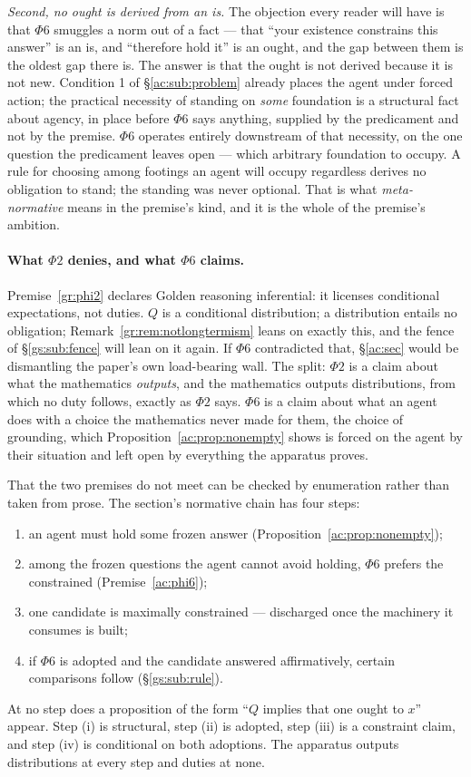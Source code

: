 \documentclass[11pt]{article}
\numberwithin{equation}{section}
\theoremstyle{plain}
\theoremstyle{definition}
\theoremstyle{remark}
\begin{document}
\emph{Second, no ought is derived from an is.} The objection every reader will have is that $\Phi6$ smuggles a norm out of a fact --- that ``your existence constrains this answer'' is an is, and ``therefore hold it'' is an ought, and the gap between them is the oldest gap there is. The answer is that the ought is not derived because it is not new. Condition 1 of \S\ref{ac:sub:problem} already places the agent under forced action; the practical necessity of standing on \emph{some} foundation is a structural fact about agency, in place before $\Phi6$ says anything, supplied by the predicament and not by the premise. $\Phi6$ operates entirely downstream of that necessity, on the one question the predicament leaves open --- which arbitrary foundation to occupy. A rule for choosing among footings an agent will occupy regardless derives no obligation to stand; the standing was never optional. That is what \emph{meta-normative} means in the premise's kind, and it is the whole of the premise's ambition.

\paragraph{What $\Phi2$ denies, and what $\Phi6$ claims.}\label{ac:rem:phi2split}
Premise~\ref{gr:phi2} declares Golden reasoning inferential: it licenses conditional expectations, not duties. $Q$ is a conditional distribution; a distribution entails no obligation; Remark~\ref{gr:rem:notlongtermism} leans on exactly this, and the fence of \S\ref{gs:sub:fence} will lean on it again. If $\Phi6$ contradicted that, \S\ref{ac:sec} would be dismantling the paper's own load-bearing wall. The split: $\Phi2$ is a claim about what the mathematics \emph{outputs}, and the mathematics outputs distributions, from which no duty follows, exactly as $\Phi2$ says. $\Phi6$ is a claim about what an agent does with a choice the mathematics never made for them, the choice of grounding, which Proposition~\ref{ac:prop:nonempty} shows is forced on the agent by their situation and left open by everything the apparatus proves.

That the two premises do not meet can be checked by enumeration rather than taken from prose. The section's normative chain has four steps:
\begin{enumerate}[label=(\roman*)]
    \item an agent must hold some frozen answer (Proposition~\ref{ac:prop:nonempty});
    \item among the frozen questions the agent cannot avoid holding, $\Phi6$ prefers the constrained (Premise~\ref{ac:phi6});
    \item one candidate is maximally constrained --- discharged once the machinery it consumes is built;
    \item if $\Phi6$ is adopted and the candidate answered affirmatively, certain comparisons follow (\S\ref{gs:sub:rule}).
\end{enumerate}
At no step does a proposition of the form ``$Q$ implies that one ought to $x$'' appear. Step (i) is structural, step (ii) is adopted, step (iii) is a constraint claim, and step (iv) is conditional on both adoptions. The apparatus outputs distributions at every step and duties at none.
\end{document}
